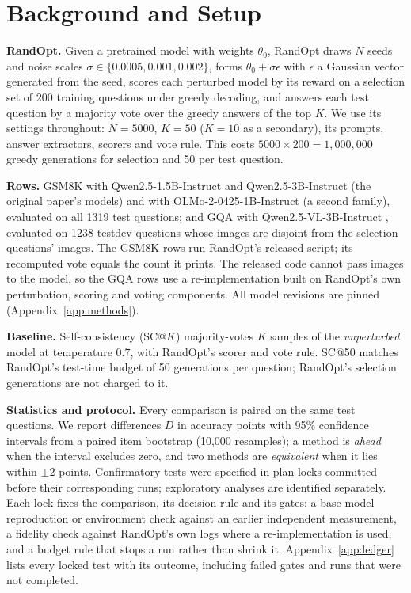 \documentclass{article}
\begin{document}
\section{Background and Setup}\label{sec:setup}
\textbf{RandOpt.} Given a pretrained model with weights $\theta_0$, RandOpt \citep{gan2026thickets} draws $N$ seeds and
noise scales $\sigma \in \{0.0005, 0.001, 0.002\}$, forms $\theta_0 + \sigma\epsilon$ with $\epsilon$ a Gaussian vector
generated from the seed, scores each perturbed model by its reward on a selection set of 200 training questions under
greedy decoding, and answers each test question by a majority vote over the greedy answers of the top $K$. We use its
settings throughout: $N{=}5000$, $K{=}50$ ($K{=}10$ as a secondary), its prompts, answer extractors, scorers and vote
rule. This costs $5000 \times 200 = 1{,}000{,}000$ greedy generations for selection and 50 per test question.

\textbf{Rows.} GSM8K \citep{cobbe2021gsm8k} with Qwen2.5-1.5B-Instruct and Qwen2.5-3B-Instruct \citep{qwen2025qwen25}
(the original paper's models) and with OLMo-2-0425-1B-Instruct \citep{olmo2024olmo2} (a second family), evaluated on all
1319 test questions; and GQA \citep{hudson2019gqa} with Qwen2.5-VL-3B-Instruct \citep{bai2025qwen25vl}, evaluated on
1238 testdev questions whose images are disjoint from the selection questions' images. The GSM8K rows run RandOpt's
released script; its recomputed vote equals the count it prints. The released code cannot pass images to the model, so
the GQA rows use a re-implementation built on RandOpt's own perturbation, scoring and voting components. All model
revisions are pinned (Appendix~\ref{app:methods}).

\textbf{Baseline.} Self-consistency \citep{wang2023selfconsistency} (SC@$K$) majority-votes $K$ samples of the
\emph{unperturbed} model at temperature 0.7, with RandOpt's scorer and vote rule. SC@50 matches RandOpt's test-time
budget of 50 generations per question; RandOpt's selection generations are not charged to it.

\textbf{Statistics and protocol.} Every comparison is paired on the same test questions. We report differences $D$ in
accuracy points with 95\% confidence intervals from a paired item bootstrap (10{,}000 resamples); a method is
\emph{ahead} when the interval excludes zero, and two methods are \emph{equivalent} when it lies within $\pm 2$ points.
Confirmatory tests were specified in plan locks committed before their corresponding runs; exploratory analyses are
identified separately. Each lock fixes the comparison, its decision rule and its gates: a base-model reproduction or
environment check against an earlier independent measurement, a fidelity check against RandOpt's own logs where a
re-implementation is used, and a budget rule that stops a run rather than shrink it. Appendix~\ref{app:ledger} lists
every locked test with its outcome, including failed gates and runs that were not completed.
\end{document}
